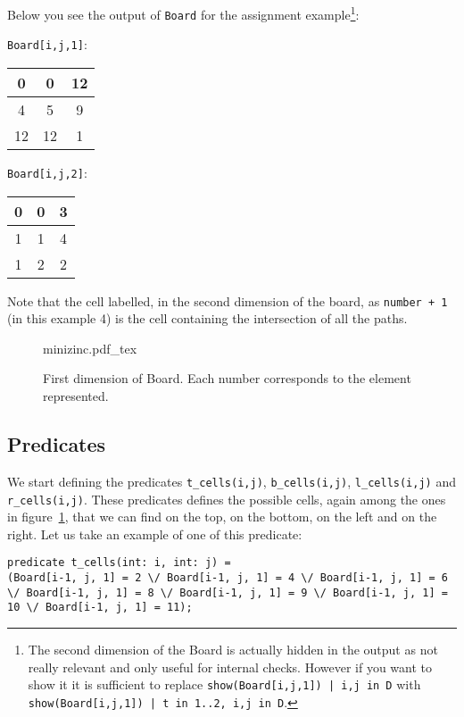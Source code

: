 Below you see the output of \texttt{Board} for the assignment example\footnote{The second dimension of the Board is actually hidden in the output as not really relevant and only useful for internal checks. However if you want to show it it is sufficient to replace \texttt{show(Board[i,j,1]) | i,j in D} with \texttt{show(Board[i,j,1]) | t in 1..2, i,j in D}.}:


\texttt{Board[i,j,1]}:
\begin{center}
    \begin{tabular}{ |c|c|c| } 
     \hline
     0 &0 &12 \\
     \hline
4 &5 &9 \\
\hline
12 &12 &1 \\
     \hline
    \end{tabular}
    \end{center}

\texttt{Board[i,j,2]}:
    \begin{center}
    \begin{tabular}{ |c|c|c| } 
        \hline
        0 &0 &3 \\
        \hline
   1 &1 &4 \\
   \hline
   1 &2 &2 \\
        \hline
       \end{tabular}
    \end{center}
Note that the cell labelled, in the second dimension of the board, as \texttt{number + 1} (in this example 4) is the cell containing the intersection of all the paths.

\begin{figure}[htb]
    \centering
    \def\svgwidth{\columnwidth}
    {minizinc.pdf_tex}
    \caption{First dimension of Board. Each number corresponds to the element represented.}
    \label{figm:board}
\end{figure}

\subsection{Predicates}\label{subsec:predicates}
We start defining the predicates \texttt{t_cells(i,j)}, \texttt{b_cells(i,j)}, \texttt{l_cells(i,j)} and \texttt{r_cells(i,j)}. These predicates defines the possible cells, again among the ones in figure~\ref{figm:board}, that we can find on the top, on the bottom, on the left and on the right.
Let us take an example of one of this predicate:
\begin{verbatim}
predicate t_cells(int: i, int: j) =
(Board[i-1, j, 1] = 2 \/ Board[i-1, j, 1] = 4 \/ Board[i-1, j, 1] = 6 \/ Board[i-1, j, 1] = 8 \/ Board[i-1, j, 1] = 9 \/ Board[i-1, j, 1] = 10 \/ Board[i-1, j, 1] = 11);
\end{verbatim}

